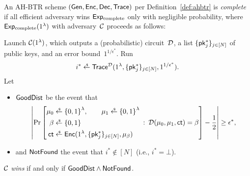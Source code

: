 \begin{definition}[completeness]\label{def:completeness}
An AH-BTR scheme $(\Gen,\Enc,\Dec,\Trace)$ per Definition~\ref{def:ahbtr} is \emph{complete}
if all efficient adversary wins $\ExpComplete$ only with negligible probability,
where $\ExpComplete(1^\lambda)$ with adversary~${\mathcal{C}}$ proceeds as follows:
\begin{security}
Launch ${\mathcal{C}}(1^\lambda)$,
which outputs a (probabilistic) circuit~${\mathcal{D}}$,
a list $\{\pk_j^\ast\}_{j\in[N]}$ of public keys, and
an error bound~$1^{1/\epsilon^\ast}$.
Run
\begin{align*}
i^\ast\draws\Trace^\scriptD(1^\lambda,\{\pk^\ast_j\}_{j\in[N]},1^{1/\epsilon^\ast}).
\end{align*}
Let
\begin{itemize}
\item $\GoodDist$ be the event that
\begin{align*}
\left|\Pr\left[
\begin{aligned}
\mu_0&{}\draws\bit^\lambda,\qquad
\mu_1\draws\bit^\lambda\\
\beta&{}\draws\bit\\
\ct&{}\draws\Enc(1^\lambda,\{\pk^\ast_j\}_{j\in[N]},\mu_\beta)
\end{aligned}
\::\:
\scriptD(\mu_0,\mu_1,\ct)=\beta
\right]-\frac12
\right|
\geq\epsilon^\ast,
\end{align*}
\item and
$\NotFound$ the event that ${i^\ast\notin[N]}$ (i.e., ${i^\ast=\bot}$).
\end{itemize}
${\mathcal{C}}$ \emph{wins} if and only if ${\GoodDist\wedge\NotFound}$.
\end{security}
\end{definition}
